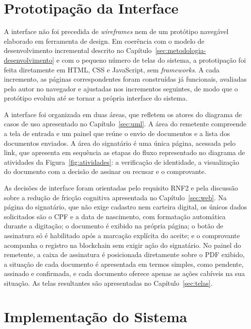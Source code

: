 \documentclass[
    12pt,
    a4paper,
    oneside,
    chapter=TITLE,
    section=TITLE,
    subsection=TITLE,
    subsubsection=TITLE,
    sumario=tradicional,
    english,
    brazil
]{abntex2}
\begin{document}
\section{Prototipação da Interface}
\label{sec:prototipacao}

A interface não foi precedida de \emph{wireframes} nem de um protótipo navegável elaborado em ferramenta de design. Em coerência com o modelo de desenvolvimento incremental descrito no Capítulo~\ref{sec:metodologia-desenvolvimento} e com o pequeno número de telas do sistema, a prototipação foi feita diretamente em HTML, CSS e JavaScript, sem \emph{frameworks}. A cada incremento, as páginas correspondentes foram construídas já funcionais, avaliadas pelo autor no navegador e ajustadas nos incrementos seguintes, de modo que o protótipo evoluiu até se tornar a própria interface do sistema.

A interface foi organizada em duas áreas, que refletem os atores do diagrama de casos de uso apresentado no Capítulo~\ref{sec:uml}. A área do remetente compreende a tela de entrada e um painel que reúne o envio de documentos e a lista dos documentos enviados. A área do signatário é uma única página, acessada pelo link, que apresenta em sequência as etapas do fluxo representado no diagrama de atividades da Figura~\ref{fig:atividades}: a verificação de identidade, a visualização do documento com a decisão de assinar ou recusar e o comprovante.

As decisões de interface foram orientadas pelo requisito RNF2 e pela discussão sobre a redução de fricção cognitiva apresentada no Capítulo~\ref{sec:web}. Na página do signatário, que não exige cadastro nem carteira digital, os únicos dados solicitados são o CPF e a data de nascimento, com formatação automática durante a digitação; o documento é exibido na própria página; o botão de assinatura só é habilitado após a marcação explícita do aceite; e o comprovante acompanha o registro na blockchain sem exigir ação do signatário. No painel do remetente, a caixa de assinatura é posicionada diretamente sobre o PDF exibido, a situação de cada documento é apresentada em termos simples, como pendente, assinado e confirmada, e cada documento oferece apenas as ações cabíveis na sua situação. As telas resultantes são apresentadas no Capítulo~\ref{sec:telas}.

\section{Implementação do Sistema}
\label{sec:implementacao}
\end{document}
